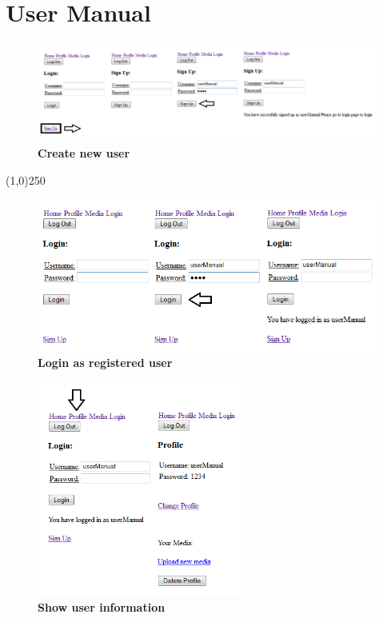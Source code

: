 \documentclass[11pt]{article}
\begin{document}
\newpage

\section{User Manual}
\begin{figure}[H]
  \caption{\textbf{Create new user}}
  \centering
    \includegraphics[width=1\textwidth]{images/UM_new_user.png}
\end{figure}

\begin{center}\line(1,0){250}\end{center}

\begin{figure}[H]
  \caption{\textbf{Login as registered user}}
  \centering
    \includegraphics[width=1\textwidth]{images/UM_login.png}
\end{figure}

\begin{figure}[H]
  \caption{\textbf{Show user information}}
  \centering
    \includegraphics[width=0.6\textwidth]{images/UM_show_user.png}
\end{figure}
\end{document}
